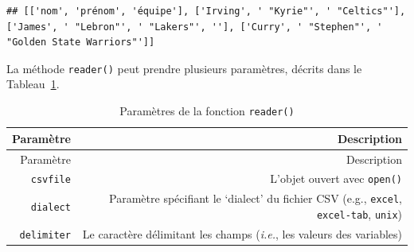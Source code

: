 \documentclass[12pt,]{book}
\numberwithin{equation}{section}
\numberwithin{countremarque}{section}
\begin{document}
\begin{lstlisting}
## [['nom', 'prénom', 'équipe'], ['Irving', ' "Kyrie"', ' "Celtics"'], ['James', ' "Lebron"', ' "Lakers"', ''], ['Curry', ' "Stephen"', ' "Golden State Warriors"']]
\end{lstlisting}

La méthode \texttt{reader()} peut prendre plusieurs paramètres, décrits
dans le Tableau~\ref{tab:parametres-reader-csv}.

\begin{longtable}[]{@{}rr@{}}
\caption{\label{tab:parametres-reader-csv} Paramètres de la fonction
\texttt{reader()}}\tabularnewline
\toprule
\begin{minipage}[b]{0.26\columnwidth}\raggedleft\strut
Paramètre\strut
\end{minipage} & \begin{minipage}[b]{0.61\columnwidth}\raggedleft\strut
Description\strut
\end{minipage}\tabularnewline
\midrule
\endfirsthead
\toprule
\begin{minipage}[b]{0.26\columnwidth}\raggedleft\strut
Paramètre\strut
\end{minipage} & \begin{minipage}[b]{0.61\columnwidth}\raggedleft\strut
Description\strut
\end{minipage}\tabularnewline
\midrule
\endhead
\begin{minipage}[t]{0.26\columnwidth}\raggedleft\strut
\texttt{csvfile}\strut
\end{minipage} & \begin{minipage}[t]{0.61\columnwidth}\raggedleft\strut
L'objet ouvert avec \texttt{open()}\strut
\end{minipage}\tabularnewline
\begin{minipage}[t]{0.26\columnwidth}\raggedleft\strut
\texttt{dialect}\strut
\end{minipage} & \begin{minipage}[t]{0.61\columnwidth}\raggedleft\strut
Paramètre spécifiant le `dialect' du fichier CSV (e.g., \texttt{excel},
\texttt{excel-tab}, \texttt{unix})\strut
\end{minipage}\tabularnewline
\begin{minipage}[t]{0.26\columnwidth}\raggedleft\strut
\texttt{delimiter}\strut
\end{minipage} & \begin{minipage}[t]{0.61\columnwidth}\raggedleft\strut
Le caractère délimitant les champs (\emph{i.e.}, les valeurs des
variables)\strut

\end{minipage}
\end{longtable}
\end{document}
